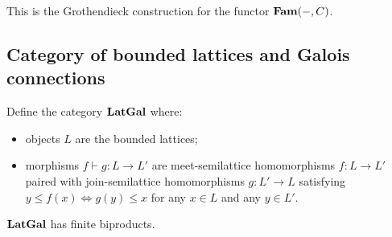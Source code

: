 \noindent This is the Grothendieck construction for the functor $\mathbf{Fam}(-,C)$.


\subsection{Category of bounded lattices and Galois connections}

Define the category $\mathbf{LatGal}$ where:
\begin{itemize}
\item objects $L$ are the bounded lattices;
\item morphisms $f \vdash g: L \to L'$ are meet-semilattice homomorphisms $f: L \to L'$ paired with
join-semilattice homomorphisms $g: L' \to L$ satisfying $y \leq f(x) \iff g(y) \leq x$ for any $x \in L$ and any
$y \in L'$.
\end{itemize}

\noindent $\mathbf{LatGal}$ has finite biproducts. 
